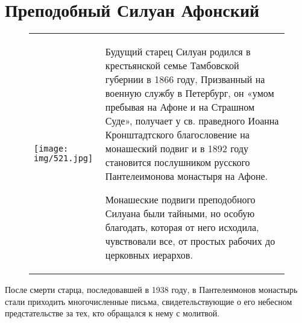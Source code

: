 \documentclass[a4paper]{article}
\begin{document}

\newlength\firstcolumnwidth
\newlength\secondcolumnwidth

\newcommand\twocolumns[3]{

\setlength\firstcolumnwidth{#1\linewidth}
\setlength\secondcolumnwidth{\linewidth - \firstcolumnwidth - 0.1\linewidth}

\begin{figure}[h]
\begin{tabular}{p{\firstcolumnwidth} p{\secondcolumnwidth}}
\vspace{1pt}#2 & #3 \\
\end{tabular}
\end{figure}
}





\section{Преподобный Силуан Афонский}




\twocolumns{0.33}{\texttt{[image: img/521.jpg]}}{
Будущий старец Силуан родился в крестьянской семье Тамбовской губернии в 1866 году, Призванный на военную службу в Петербург, он «умом пребывая на Афоне и на Страшном Суде», получает у св. праведного Иоанна Кронштадтского благословение на монашеский подвиг и в 1892 году становится послушником русского Пантелеимонова монастыря на Афоне.

Монашеские подвиги преподобного Силуана были тайными, но особую благодать, которая от него исходила, чувствовали все, от простых рабочих до церковных иерархов. 

}




После смерти старца, последовавшей в 1938 году, в Пантелеимонов монастырь стали приходить многочисленные письма, свидетельствующие о его небесном предстательстве за тех, кто обращался к нему с молитвой.
\end{document}
